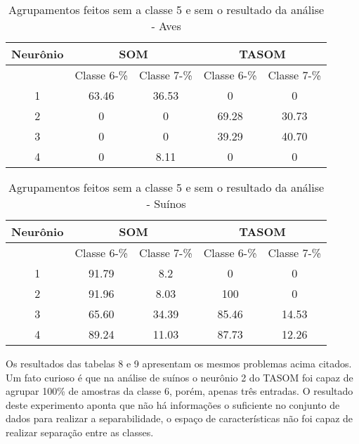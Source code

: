 \begin{table}[h]
\centering
\caption{Agrupamentos feitos sem a classe 5 e sem o resultado da análise - Aves}
\label{my-label}
\begin{tabular}{|c|c|c|c|c|}
\hline
Neurônio & \multicolumn{2}{c|}{SOM} & \multicolumn{2}{c|}{TASOM} \\ \hline
         & Classe 6-\%    & Classe 7-\%   & Classe 6-\%     & Classe 7-\%    \\ \hline
1        & 63.46       & 36.53      & 0            & 0           \\ \hline
2        & 0           & 0          & 69.28        & 30.73       \\ \hline
3        & 0           & 0          & 39.29        & 40.70       \\ \hline
4        & 0           & 8.11       & 0            & 0           \\ \hline
\end{tabular}
\end{table}

\begin{table}[h]
\centering
\caption{Agrupamentos feitos sem a classe 5 e sem o resultado da análise - Suínos}
\label{my-label}
\begin{tabular}{|c|c|c|c|c|}
\hline
Neurônio & \multicolumn{2}{c|}{SOM} & \multicolumn{2}{c|}{TASOM} \\ \hline
         & Classe 6-\%    & Classe 7-\%   & Classe 6-\%    & Classe 7-\%    \\ \hline
1        & 91.79       & 8.2      & 0            & 0           \\ \hline
2        & 91.96           & 8.03          & 100          & 0           \\ \hline
3        & 65.60           & 34.39          & 85.46        & 14.53       \\ \hline
4        & 89.24       & 11.03          & 87.73        & 12.26       \\ \hline
\end{tabular}
\end{table}

Os resultados das tabelas 8 e 9 apresentam os mesmos problemas acima citados. Um fato curioso é que na análise de suínos o neurônio 2 do TASOM foi capaz de agrupar 100\% de amostras da classe 6, porém, apenas três entradas. O resultado deste experimento aponta que não há informações o suficiente no conjunto de dados para realizar a separabilidade, o espaço de características não foi capaz de realizar separação entre as classes.

